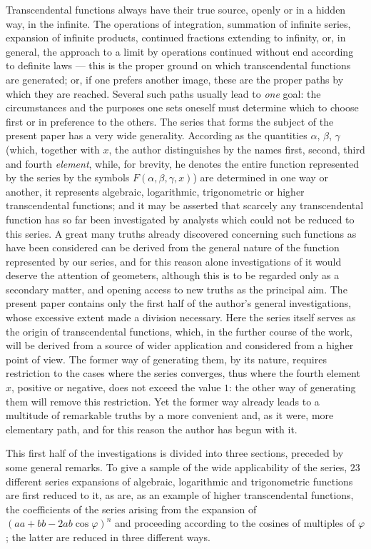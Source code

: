 Transcendental functions always have their true source, openly or in a hidden way, in the infinite. The operations of integration, summation of infinite series, expansion of infinite products, continued fractions extending to infinity, or, in general, the approach to a limit by operations continued without end according to definite laws --- this is the proper ground on which transcendental functions are generated; or, if one prefers another image, these are the proper paths by which they are reached. Several such paths usually lead to \emph{one} goal: the circumstances and the purposes one sets oneself must determine which to choose first or in preference to the others. The series that forms the subject of the present paper has a very wide generality. According as the quantities $\alpha$, $\beta$, $\gamma$ (which, together with $x$, the author distinguishes by the names first, second, third and fourth \emph{element}, while, for brevity, he denotes the entire function represented by the series by the symbols $F(\alpha,\beta,\gamma,x)$) are determined in one way or another, it represents algebraic, logarithmic, trigonometric or higher transcendental functions; and it may be asserted that scarcely any transcendental function has so far been investigated by analysts which could not be reduced to this series. A great many truths already discovered concerning such functions as have been considered can be derived from the general nature of the function represented by our series, and for this reason alone investigations of it would deserve the attention of geometers, although this is to be regarded only as a secondary matter, and opening access to new truths as the principal aim. The present paper contains only the first half of the author's general investigations, whose excessive extent made a division necessary. Here the series itself serves as the origin of transcendental functions, which, in the further course of the work, will be derived from a source of wider application and considered from a higher point of view. The former way of generating them, by its nature, requires restriction to the cases where the series converges, thus where the fourth element $x$, positive or negative,
does not exceed the value $1$: the other way of generating them will remove this restriction. Yet the former way already leads to a multitude of remarkable truths by a more convenient and, as it were, more elementary path, and for this reason the author has begun with it.

This first half of the investigations is divided into three sections, preceded by some general remarks. To give a sample of the wide applicability of the series, $23$ different series expansions of algebraic, logarithmic and trigonometric functions are first reduced to it, as are, as an example of higher transcendental functions, the coefficients of the series arising from the expansion of $(aa+bb-2ab\cos\varphi)^n$ and proceeding according to the cosines of multiples of $\varphi$; the latter are reduced in three different ways.

